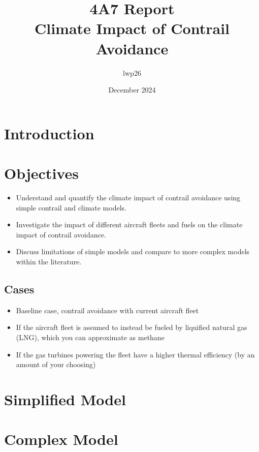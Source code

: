 \documentclass{article}
\begin{document}
\title{4A7 Report \\ Climate Impact of Contrail Avoidance}
\author{lwp26}
\date{December 2024}
\maketitle

\section{Introduction}

\section{Objectives}

\begin{itemize}
    \item Understand and quantify the climate impact of contrail avoidance using simple contrail and climate models.
    \item Investigate the impact of different aircraft fleets and fuels on the climate impact of contrail avoidance.
    \item Discuss limitations of simple models and compare to more complex models within the literature.
\end{itemize}

\subsection{Cases}

\begin{itemize}
    \item Baseline case, contrail avoidance with current aircraft fleet
    \item If the aircraft fleet is assumed to instead be fueled by liquified natural gas (LNG), which you can approximate as methane
    \item If the gas turbines powering the fleet have a higher thermal efficiency (by an amount of your choosing) 
\end{itemize}

\section{Simplified Model}


\section{Complex Model}
\end{document}
